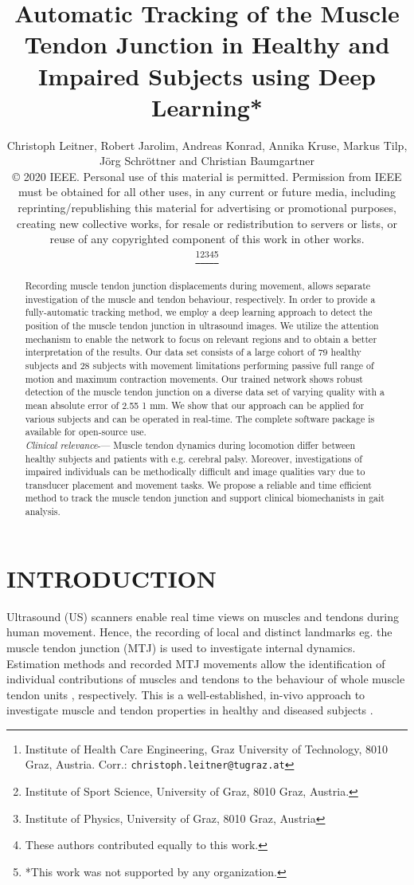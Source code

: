\documentclass[letterpaper, 10 pt, conference]{ieeeconf}
\title{\bf \large{Automatic Tracking of the Muscle Tendon Junction in Healthy and Impaired Subjects using Deep Learning*}}
\author{\parbox{15cm}{\centering \small{Christoph Leitner, Robert Jarolim, Andreas Konrad, Annika Kruse, Markus Tilp, J\"org Schr\"ottner and Christian Baumgartner}\\
\tiny{© 2020 IEEE. Personal use of this material is permitted. Permission from IEEE must be obtained for all other uses, in any current or future media, including reprinting/republishing this material for advertising or promotional purposes, creating new collective works, for resale or redistribution to servers or lists, or reuse of any copyrighted component of this work in other works.}
}
\thanks{Institute of Health Care Engineering, Graz University of Technology, 8010 Graz, Austria. Corr.: {\tt\small christoph.leitner@tugraz.at}}\thanks{Institute of Sport Science, University of Graz, 8010 Graz, Austria.}\thanks{Institute of Physics, University of Graz, 8010 Graz, Austria}\thanks{These authors contributed equally to this work.}\thanks{*This work was not supported by any organization.}}
\begin{document}
\maketitle
\thispagestyle{empty}
\pagestyle{empty}


\begin{abstract}
Recording muscle tendon junction displacements during movement, allows separate investigation of the muscle and tendon behaviour, respectively. In order to provide a fully-automatic tracking method, we employ a deep learning approach to detect the position of the muscle tendon junction in ultrasound images. We utilize the attention mechanism to enable the network to focus on relevant regions and to obtain a better interpretation of the results. Our data set consists of a large cohort of 79 healthy subjects and 28 subjects with movement limitations performing passive full range of motion and maximum contraction movements. Our trained network shows robust detection of the muscle tendon junction on a diverse data set of varying quality with a mean absolute error of 2.55  1 mm. We show that our approach can be applied for various subjects and can be operated in real-time. The complete software package is available for open-source use.
\newline
\\
\indent \textit{Clinical relevance}-— Muscle tendon dynamics during locomotion differ between healthy subjects and patients with e.g. cerebral palsy. Moreover, investigations of impaired individuals can be methodically difficult and image qualities vary due to transducer placement and movement tasks. We propose a reliable and time efficient method to track the muscle tendon junction and support clinical biomechanists in gait analysis.
\end{abstract}
\section{INTRODUCTION}
\label{sect:introduction}
Ultrasound (US) scanners enable real time views on muscles and tendons during human movement. Hence, the recording of local and distinct landmarks eg. the muscle tendon junction (MTJ) is used to investigate internal dynamics. Estimation methods and recorded MTJ movements allow the identification of individual contributions of muscles and tendons to the behaviour of whole muscle tendon units \cite{j:Leitner2020}, respectively. This is a well-established, in-vivo approach to investigate muscle and tendon properties in healthy \cite{j:Dick2016} and diseased subjects \cite{j:Barber2017}.
\end{document}
